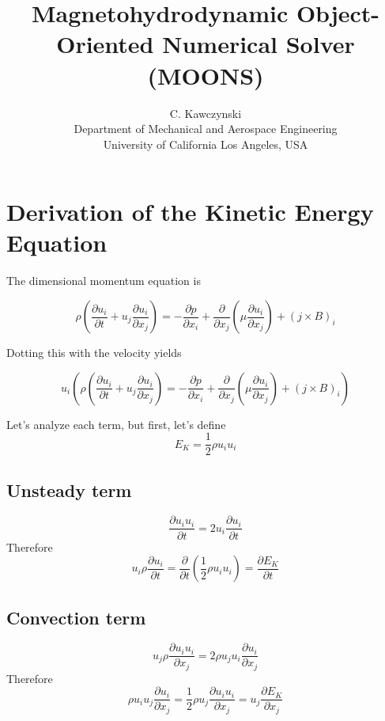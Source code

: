 \documentclass[11pt]{article}
\newcommand{\PD}{\partial}
\begin{document}
\doublespacing
\title{Magnetohydrodynamic Object-Oriented Numerical Solver (MOONS)}
\author{C. Kawczynski \\
Department of Mechanical and Aerospace Engineering \\
University of California Los Angeles, USA\\
}
\maketitle

\section{Derivation of the Kinetic Energy Equation}
The dimensional momentum equation is

\begin{equation}
	\rho \left( 
	\frac{\PD u_i}{\PD t} + 
	u_j\frac{\PD u_i}{\PD x_j}
	\right)
	= 
	- \frac{\PD p}{\PD x_i}
	+ \frac{\PD}{\PD x_j} \left( \mu \frac{\PD u_i}{\PD x_j} \right)
	+ (j \times B)_i
\end{equation}

Dotting this with the velocity yields

\begin{equation}
	\boxed{
	u_i
	\left(
	\rho \left( 
	\frac{\PD u_i}{\PD t} + 
	u_j\frac{\PD u_i}{\PD x_j}
	\right)
	= 
	- \frac{\PD p}{\PD x_i}
	+ \frac{\PD}{\PD x_j} \left( \mu \frac{\PD u_i}{\PD x_j} \right)
	+ (j \times B)_i
	\right)
	}
\end{equation}

Let's analyze each term, but first, let's define
\begin{equation}
	E_K = \frac{1}{2} \rho u_i u_i
\end{equation}

\subsection{Unsteady term}
\begin{equation}
	\frac{\PD u_i u_i}{\PD t} =
	2 u_i \frac{\PD u_i}{\PD t}
\end{equation}
Therefore
\begin{equation}
	\boxed{
	u_i \rho \frac{\PD u_i}{\PD t} =
	\frac{\PD}{\PD t} \left( \frac{1}{2} \rho u_i u_i \right) =
	\frac{\PD E_K}{\PD t}
	}
\end{equation}

\subsection{Convection term}
\begin{equation}
	u_j \rho \frac{\PD u_i u_i}{\PD x_j} =
	2 \rho u_j u_i \frac{\PD u_i}{\PD x_j}
\end{equation}
Therefore
\begin{equation}
	\boxed{
	\rho u_i u_j \frac{\PD u_i}{\PD x_j} =
	\frac{1}{2} \rho u_j \frac{\PD u_i u_i}{\PD x_j}
	= u_j \frac{\PD E_K}{\PD x_j}
	}
\end{equation}
\end{document}
